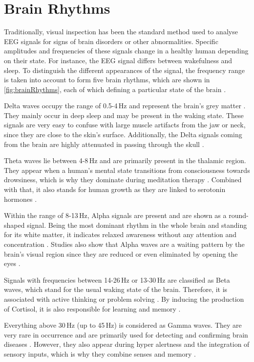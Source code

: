   \section{Brain Rhythms}
    Traditionally, visual inspection has been the standard method used to analyse \ac{EEG} signals for signs of brain disorders or other abnormalities. Specific amplitudes and frequencies of these signals change in a healthy human depending on their state. For instance, the \ac{EEG} signal differs between wakefulness and sleep. To distinguish the different appearances of the signal, the frequency range is taken into account to form five brain rhythms, which are shown in \autoref{fig:brainRhythms}, each of which defining a particular state of the brain \cite{sanei2021eeg}. \par
    Delta waves occupy the range of 0.5-4\,Hz and represent the brain's grey matter \cite{kumar2012analysis}. They mainly occur in deep sleep and may be present in the waking state. These signals are very easy to confuse with large muscle artifacts from the jaw or neck, since they are close to the skin's surface. Additionally, the Delta signals coming from the brain are highly attenuated in passing through the skull \cite{sanei2021eeg}. \par
    Theta waves lie between 4-8\,Hz and are primarily present in the thalamic region. They appear when a human's mental state transitions from consciousness towards drowsiness, which is why they dominate during meditation therapy \cite{sanei2021eeg,kumar2012analysis}. Combined with that, it also stands for human growth as they are linked to serotonin hormones \cite{kumar2012analysis}. \par
    Within the range of 8-13\,Hz, Alpha signals are present and are shown as a round-shaped signal. Being the most dominant rhythm in the whole brain and standing for its white matter, it indicates relaxed awareness without any attention and concentration \cite{sanei2021eeg,kumar2012analysis}. Studies also show that Alpha waves are a waiting pattern by the brain's visual region since they are reduced or even eliminated by opening the eyes \cite{sanei2021eeg}. \par
    Signals with frequencies between 14-26\,Hz \cite{sanei2021eeg} or 13-30\,Hz \cite{kumar2012analysis} are classified as Beta waves, which stand for the usual waking state of the brain. Therefore, it is associated with active thinking or problem solving \cite{sanei2021eeg}. By inducing the production of Cortisol, it is also responsible for learning and memory \cite{kumar2012analysis}. \par
    Everything above 30\,Hz (up to 45\,Hz) is considered as Gamma waves. They are very rare in occurrence and are primarily used for detecting and confirming brain diseases \cite{sanei2021eeg}. However, they also appear during hyper alertness and the integration of sensory inputs, which is why they combine senses and memory \cite{kumar2012analysis}.



